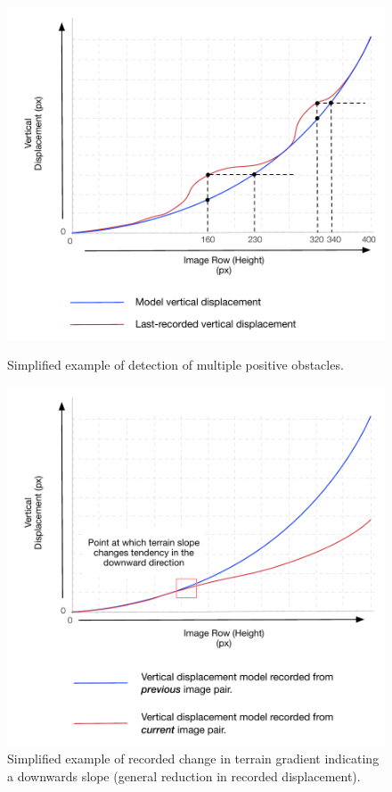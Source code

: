 \begin{figure}[htbp]
\begin{minipage}[b]{0.5\linewidth}
\centering
\includegraphics[width=\linewidth]{images/multi_obstacle_graph.pdf}
\caption{Simplified example of detection of multiple positive obstacles.}
\label{fig:multi_obstacle}
\end{minipage}
\hspace{0.5cm}
\begin{minipage}[b]{0.5\linewidth}
\centering
\includegraphics[width=\linewidth]{images/gradient_graph.pdf}
\caption{Simplified example of recorded change in terrain gradient indicating a downwards slope (general reduction in recorded displacement).}
\label{fig:gradient}
\end{minipage}
\end{figure}
 
